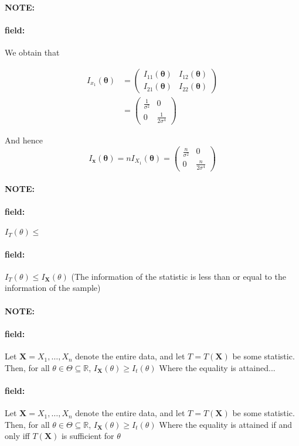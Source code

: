 \documentclass[12pt]{article}
\newenvironment{note}{\paragraph{NOTE:}}{}
\newenvironment{field}{\paragraph{field:}}{}
\begin{document}
\begin{note}
\begin{field}
    We obtain that

    \begin{align*}
      I_{x_1}(\boldsymbol\theta) &= \begin{pmatrix}
        I_{11}(\boldsymbol\theta) & I_{12}(\boldsymbol\theta)\\
        I_{21}(\boldsymbol\theta) & I_{22}(\boldsymbol\theta)
    \end{pmatrix}\\
    &= \begin{pmatrix}
      \frac{1}{\sigma^2} & 0 \\ 0 & \frac{1}{2\sigma^4}
    \end{pmatrix}
    \end{align*}


    And hence $$ I_{\mathbf{x}}(\boldsymbol\theta) = n I_{X_1}(\boldsymbol\theta) = \begin{pmatrix}
      \frac{n}{\sigma^2} & 0 \\ 0 & \frac{n}{2\sigma^4}
    \end{pmatrix} $$
  \end{field}
\end{note}

\begin{note}
  \begin{field}
    $I_T(\theta) \leq $
  \end{field}
  \begin{field}
    $I_T(\theta) \leq I_{\mathbf{X}}(\theta)$
    (The information of the statistic is less than or equal to the information of the sample)
  \end{field}
\end{note}


\begin{note}
  \begin{field}
    Let $\mathbf{X} = X_1, \ldots , X_n$ denote the entire data, and let $T = T(\mathbf{X})$ be some statistic. Then, for all $\theta \in \Theta \subseteq \mathbb{R}$, $I_{\mathbf{X}} (\theta) \geq I_t(\theta)$
    Where the equality is attained...
  \end{field}
  \begin{field}
    Let $\mathbf{X} = X_1, \ldots , X_n$ denote the entire data, and let $T = T(\mathbf{X})$ be some statistic. Then, for all $\theta \in \Theta \subseteq \mathbb{R}$, $I_{\mathbf{X}} (\theta) \geq I_t(\theta)$
    Where the equality is attained if and only iff $T(\mathbf{X})$ is sufficient for $\theta$
  \end{field}
\end{note}
\end{document}
